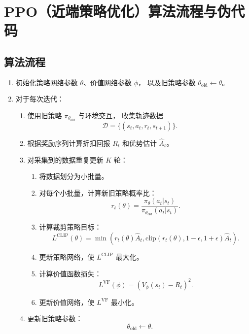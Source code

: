 \documentclass[UTF8]{ctexart}
\begin{document}
\section{PPO（近端策略优化）算法流程与伪代码}

\subsection*{算法流程}

\begin{enumerate}
    \item 初始化策略网络参数 $\theta$、价值网络参数 $\phi$，
    以及旧策略参数 $\theta_{\text{old}}\leftarrow\theta$。
    
    \item 对于每次迭代：
    \begin{enumerate}
        \item 使用旧策略 $\pi_{\theta_{\text{old}}}$ 与环境交互，
        收集轨迹数据
        \[
        \mathcal{D}=\{(s_t,a_t,r_t,s_{t+1})\}.
        \]
        
        \item 根据奖励序列计算折扣回报 $R_t$ 和优势估计 $\hat{A}_t$。
        
        \item 对采集到的数据重复更新 $K$ 轮：
        \begin{enumerate}
            \item 将数据划分为小批量。
            
            \item 对每个小批量，计算新旧策略概率比：
            \[
            r_t(\theta)
            =
            \frac{
            \pi_{\theta}(a_t|s_t)
            }{
            \pi_{\theta_{\text{old}}}(a_t|s_t)
            }.
            \]
            
            \item 计算裁剪策略目标：
            \[
            L^{\text{CLIP}}(\theta)
            =
            \min
            \left(
            r_t(\theta)\hat{A}_t,
            \text{clip}(r_t(\theta),1-\epsilon,1+\epsilon)\hat{A}_t
            \right).
            \]
            
            \item 更新策略网络，使 $L^{\text{CLIP}}$ 最大化。
            
            \item 计算价值函数损失：
            \[
            L^{\text{VF}}(\phi)
            =
            \left(
            V_{\phi}(s_t)-R_t
            \right)^2.
            \]
            
            \item 更新价值网络，使 $L^{\text{VF}}$ 最小化。
        \end{enumerate}
        
        \item 更新旧策略参数：
        \[
        \theta_{\text{old}}\leftarrow\theta.
        \]
    \end{enumerate}
\end{enumerate}
\end{document}
